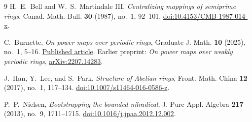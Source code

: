 \documentclass[11pt]{article}
\theoremstyle{remark}
\begin{document}
\begin{thebibliography}{9}
H.~E.~Bell and W.~S.~Martindale III,
\emph{Centralizing mappings of semiprime rings},
Canad. Math. Bull. \textbf{30} (1987), no.~1, 92--101.
\href{https://doi.org/10.4153/CMB-1987-014-x}{doi:10.4153/CMB-1987-014-x}.

C.~Burnette,
\emph{On power maps over periodic rings},
Graduate J. Math. \textbf{10} (2025), no.~1, 5--16.
\href{https://gradmath.org/wp-content/uploads/2025/07/GJM2025-Burnette.pdf}{Published article}.
Earlier preprint: \emph{On power maps over weakly periodic rings},
\href{https://arxiv.org/abs/2207.14283}{arXiv:2207.14283}.

J.~Han, Y.~Lee, and S.~Park,
\emph{Structure of Abelian rings},
Front. Math. China \textbf{12} (2017), no.~1, 117--134.
\href{https://doi.org/10.1007/s11464-016-0586-z}{doi:10.1007/s11464-016-0586-z}.

P.~P.~Nielsen,
\emph{Bootstrapping the bounded nilradical},
J. Pure Appl. Algebra \textbf{217} (2013), no.~9, 1711--1715.
\href{https://doi.org/10.1016/j.jpaa.2012.12.002}{doi:10.1016/j.jpaa.2012.12.002}.
\end{thebibliography}
\end{document}
